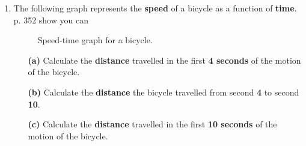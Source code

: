 \documentclass[A4,12pt]{article}
\begin{document}
\begin{enumerate}[label=\bfseries (\arabic*)]
\item The following graph represents the \textbf{speed} of a bicycle as a function of \textbf{time}. \cite{CCEADA,Triguero} p. 352 show you can 
%
\begin{figure}[H]
    \centering
    \caption{Speed-time graph for a bicycle.}
    \label{fig:my_label}
\end{figure}
%
\begin{itemize}
    \item[\bf (a)] Calculate the \textbf{distance} travelled in the first \textbf{4 seconds} of the motion of the bicycle.
    \item[\bf (b)] Calculate the \textbf{distance} the bicycle travelled from second \textbf{4} to second \textbf{10}.
    \item[\bf (c)]Calculate the \textbf{distance} travelled in the first \textbf{10 seconds} of the motion of the bicycle.
\end{itemize}


























\end{enumerate}
\end{document}
